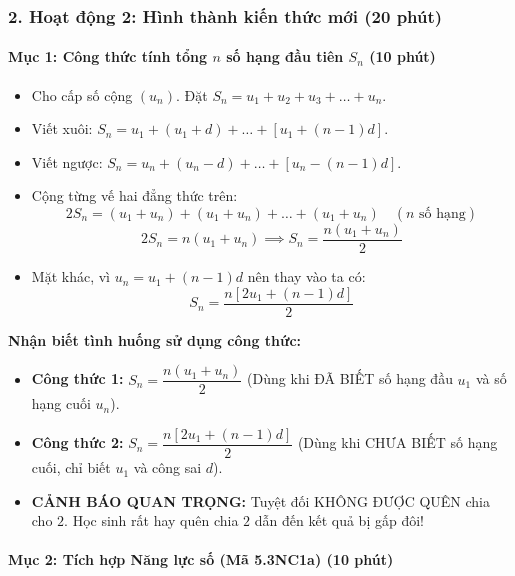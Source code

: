 \documentclass[12pt, a4paper]{article}
\begin{document}
\subsubsection*{2. Hoạt động 2: Hình thành kiến thức mới (20 phút)}


\paragraph{Mục 1: Công thức tính tổng $n$ số hạng đầu tiên $S_n$ (10 phút)}
\begin{itemize}
    \item Cho cấp số cộng $(u_n)$. Đặt $S_n = u_1 + u_2 + u_3 + \dots + u_n$.
    \item Viết xuôi: $S_n = u_1 + (u_1 + d) + \dots + [u_1 + (n - 1)d]$.
    \item Viết ngược: $S_n = u_n + (u_n - d) + \dots + [u_n - (n - 1)d]$.
    \item Cộng từng vế hai đẳng thức trên:
    $$2S_n = (u_1 + u_n) + (u_1 + u_n) + \dots + (u_1 + u_n) \quad (n \text{ số hạng})$$
    $$2S_n = n(u_1 + u_n) \implies S_n = \dfrac{n(u_1 + u_n)}{2}$$
    \item Mặt khác, vì $u_n = u_1 + (n - 1)d$ nên thay vào ta có:
    $$S_n = \dfrac{n[2u_1 + (n - 1)d]}{2}$$
\end{itemize}


\begin{scaffoldbox}
    \textbf{Nhận biết tình huống sử dụng công thức:}
    \begin{itemize}
        \item \textbf{Công thức 1:} $S_n = \dfrac{n(u_1 + u_n)}{2}$ (Dùng khi ĐÃ BIẾT số hạng đầu $u_1$ và số hạng cuối $u_n$).
        \item \textbf{Công thức 2:} $S_n = \dfrac{n[2u_1 + (n - 1)d]}{2}$ (Dùng khi CHƯA BIẾT số hạng cuối, chỉ biết $u_1$ và công sai $d$).
        \item \textbf{CẢNH BÁO QUAN TRỌNG:} Tuyệt đối KHÔNG ĐƯỢC QUÊN chia cho $2$. Học sinh rất hay quên chia $2$ dẫn đến kết quả bị gấp đôi!
    \end{itemize}
\end{scaffoldbox}


\paragraph{Mục 2: Tích hợp Năng lực số (Mã 5.3NC1a) (10 phút)}
\end{document}
